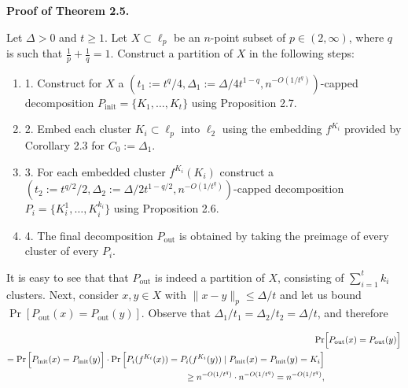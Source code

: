 \documentclass[10pt,a4paper]{amsart}
\begin{document}
\par\medskip\noindent\textbf{Proof of Theorem 2.5.}\par
Let $\Delta>0$ and $t\geq 1$. Let $X\subset\ell_{p}$ be an $n$-point subset of $p\in(2,\infty)$, where $q$ is such that $\frac{1}{p}+\frac{1}{q}=1$. Construct a partition of $X$ in the following steps:
\par
\begin{enumerate}
\item  1. 
Construct for $X$ a $(t_{1}:=t^{q}/4,\Delta_{1}:=\Delta/4t^{1-q},n^{-O(1/t^{q})})$-capped decomposition $P_{\text{init}}=\{K_{1},\ldots,K_{t}\}$ using Proposition 2.7.
\par
\par
\item  2. 
Embed each cluster $K_{i}\subset\ell_{p}$ into $\ell_{2}$ using the embedding $f^{K_{i}}$ provided by Corollary 2.3 for $C_{0}:=\Delta_{1}$.
\par
\par
\item  3. 
For each embedded cluster $f^{K_{i}}(K_{i})$ construct a $(t_{2}:=t^{q/2}/2,\Delta_{2}:=\Delta/2t^{1-q/2},n^{-O(1/t^{q})})$-capped decomposition $P_{i}=\{K_{i}^{1},\ldots,K_{i}^{k_{i}}\}$ using Proposition 2.6.
\par
\par
\item  4. 
The final decomposition $P_{\text{out}}$ is obtained by taking the preimage of every cluster of every $P_{i}$.
\par
\par
\end{enumerate}
\par
It is easy to see that that $P_{\text{out}}$ is indeed a partition of $X$, consisting of $\sum_{i=1}^{t}k_{i}$ clusters. Next, consider $x,y\in X$ with $\|x-y\|_{p}\leq\Delta/t$ and let us bound $\Pr[P_{\text{out}}(x)=P_{\text{out}}(y)]$. Observe that $\Delta_{1}/t_{1}=\Delta_{2}/t_{2}=\Delta/t$, and therefore
\par
\[\begin{aligned}
\displaystyle\Pr & \displaystyle\Big{[}P_{\text{out}}(x)=P_{\text{out}}(y)\Big{]} \\
\displaystyle=\Pr\Big{[}P_{\text{init}}(x)=P_{\text{init}}(y)\Big{]}\cdot\Pr%
\Big{[}P_{i}(f^{K_{i}}(x))=P_{i}(f^{K_{i}}(y))\mid P_{\text{init}}(x)=P_{\text%
{init}}(y)=K_{i}\Big{]} \\
\displaystyle\geq n^{-O\left(1/t^{q}\right)}\cdot n^{-O\left(1/t^{q}\right)}=n%
^{-O\left(1/t^{q}\right)},
\end{aligned}\]
\end{document}
